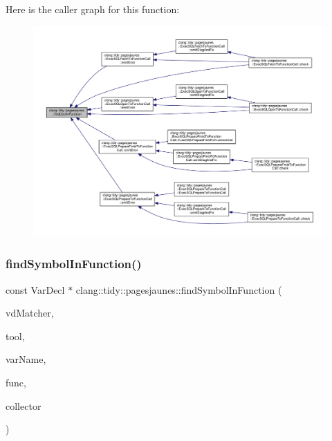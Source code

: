 Here is the caller graph for this function\+:
\nopagebreak
\begin{figure}[H]
\begin{center}
\leavevmode
\includegraphics[width=350pt]{namespaceclang_1_1tidy_1_1pagesjaunes_a67de085293c9e68c265f89f9159c7b8f_icgraph}
\end{center}
\end{figure}
\mbox{\label{namespaceclang_1_1tidy_1_1pagesjaunes_a7fb85380c1d6d7f0778ea98d38abb7ee}} 
\subsubsection{\texorpdfstring{find\+Symbol\+In\+Function()}{findSymbolInFunction()}}
{\footnotesize\ttfamily const Var\+Decl $\ast$ clang\+::tidy\+::pagesjaunes\+::find\+Symbol\+In\+Function (\begin{DoxyParamCaption}\item[{Match\+Finder\+::\+Match\+Callback \&}]{vd\+Matcher,  }\item[{Clang\+Tool $\ast$}]{tool,  }\item[{std\+::string \&}]{var\+Name,  }\item[{const Function\+Decl $\ast$}]{func,  }\item[{std\+::vector$<$ struct \hyperlink{structclang_1_1tidy_1_1pagesjaunes_1_1_var_decl_match_record}{clang\+::tidy\+::pagesjaunes\+::\+Var\+Decl\+Match\+Record} $\ast$$>$ \&}]{collector }\end{DoxyParamCaption})}



